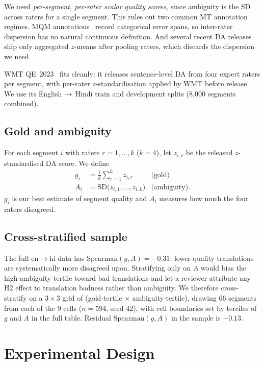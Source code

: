 \documentclass[11pt]{article}
\begin{document}
We need \emph{per-segment, per-rater scalar quality scores}, since
ambiguity is the SD across raters for a single segment. This rules out
two common MT annotation regimes. MQM
annotations~\cite{kocmi-federmann-2023-gemba-mqm} record categorical
error spans, so inter-rater dispersion has no natural continuous
definition. And several recent DA releases ship only aggregated
$z$-means after pooling raters, which discards the dispersion we need.

WMT QE~2023~\cite{wmt-qe-2023} fits cleanly: it releases sentence-level
DA from four expert raters per segment, with per-rater $z$-standardisation
applied by WMT before release. We use its English\,$\to$\,Hindi train and
development splits (8{,}000 segments combined).

\subsection{Gold and ambiguity}

For each segment $i$ with raters $r = 1, \ldots, k$ ($k=4$), let $z_{i,r}$
be the released $z$-standardised DA score. We define
\begin{align*}
g_i &= \frac{1}{k}\sum_{r=1}^{k} z_{i,r}                & \text{(gold)} \\
A_i &= \mathrm{SD}\bigl(z_{i,1}, \ldots, z_{i,k}\bigr)  & \text{(ambiguity)}.
\end{align*}
$g_i$ is our best estimate of segment quality and $A_i$ measures how much
the four raters disagreed.

\subsection{Cross-stratified sample}
\label{sec:sample}

The full en$\to$hi data has $\mathrm{Spearman}(g, A) = -0.31$:
lower-quality translations are systematically more disagreed upon.
Stratifying only on $A$ would bias the high-ambiguity tertile toward bad
translations and let a reviewer attribute any H2 effect to translation
badness rather than ambiguity. We therefore cross-stratify on a
$3 \times 3$ grid of (gold-tertile $\times$ ambiguity-tertile), drawing
66 segments from each of the 9 cells ($n=594$, seed 42), with cell
boundaries set by terciles of $g$ and $A$ in the full table. Residual
$\mathrm{Spearman}(g, A)$ in the sample is $-0.13$.

\section{Experimental Design}
\end{document}
